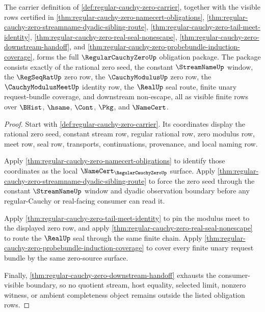 \begin{theorem}
\label{thm:regular-cauchy-zero-obligation-closure-package}
The carrier definition of \autoref{def:regular-cauchy-zero-carrier}, together with the visible rows certified in \autoref{thm:regular-cauchy-zero-namecert-obligations}, \autoref{thm:regular-cauchy-zero-streamname-dyadic-sibling-route}, \autoref{thm:regular-cauchy-zero-tail-meet-identity}, \autoref{thm:regular-cauchy-zero-real-seal-nonescape}, \autoref{thm:regular-cauchy-zero-downstream-handoff}, and \autoref{thm:regular-cauchy-zero-probebundle-induction-coverage}, forms the full $\RegularCauchyZeroUp$ obligation package. The package consists exactly of the rational zero seed, the constant $\StreamNameUp$ window, the $\RegSeqRatUp$ zero row, the $\CauchyModulusUp$ zero row, the $\CauchyModulusMeetUp$ identity row, the $\RealUp$ seal route, finite unary request-bundle coverage, and downstream non-escape, all as visible finite rows over $\BHist$, $\hsame$, $\Cont$, $\Pkg$, and $\NameCert$.
\end{theorem}
\begin{proof}
Start with \autoref{def:regular-cauchy-zero-carrier}. Its coordinates display the rational zero seed, constant stream row, regular rational row, zero modulus row, meet row, seal row, transports, continuations, provenance, and local naming row.

Apply \autoref{thm:regular-cauchy-zero-namecert-obligations} to identify those coordinates as the local $\NameCert_{\RegularCauchyZeroUp}$ surface. Apply \autoref{thm:regular-cauchy-zero-streamname-dyadic-sibling-route} to force the zero seed through the constant $\StreamNameUp$ window and dyadic observation boundary before any regular-Cauchy or real-facing consumer can read it.

Apply \autoref{thm:regular-cauchy-zero-tail-meet-identity} to pin the modulus meet to the displayed zero row, and apply \autoref{thm:regular-cauchy-zero-real-seal-nonescape} to route the $\RealUp$ seal through the same finite chain. Apply \autoref{thm:regular-cauchy-zero-probebundle-induction-coverage} to cover every finite unary request bundle by the same zero-source surface.

Finally, \autoref{thm:regular-cauchy-zero-downstream-handoff} exhausts the consumer-visible boundary, so no quotient stream, host equality, selected limit, nonzero witness, or ambient completeness object remains outside the listed obligation rows.
\end{proof}

